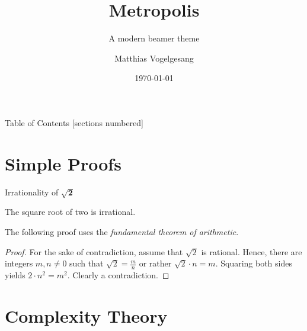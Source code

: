 \documentclass[10pt,aspectratio=169,english]{beamer}
\title{Metropolis}
\subtitle{A modern beamer theme}
\date{\today}
\author{Matthias Vogelgesang}
\institute{Center for modern beamer themes}
\begin{document}
\nocite{beamer} %

\maketitle

\begin{frame}{Table of Contents}
  [sections numbered] %
  \tableofcontents[hideallsubsections]
\end{frame}




\section{Simple Proofs}

\begin{frame}{Irrationality of $\mathbf{\sqrt{2}}$}
	\begin{theorem}
	The square root of two is irrational.
	\end{theorem}
 	The following proof uses the \emph{fundamental theorem of arithmetic}.
	\begin{proof}[Proof\nopunct]
	For the sake of contradiction, assume that $\sqrt{2}$ is rational. Hence, there are integers $m,n \neq 0$ such that $\sqrt{2} = \frac{m}{n}$ or rather $\sqrt{2} \cdot n = m$.
        Squaring both sides yields $2 \cdot n^2 = m^2$. Clearly a contradiction.
	\end{proof}
\end{frame}




\section{Complexity Theory}
\end{document}

